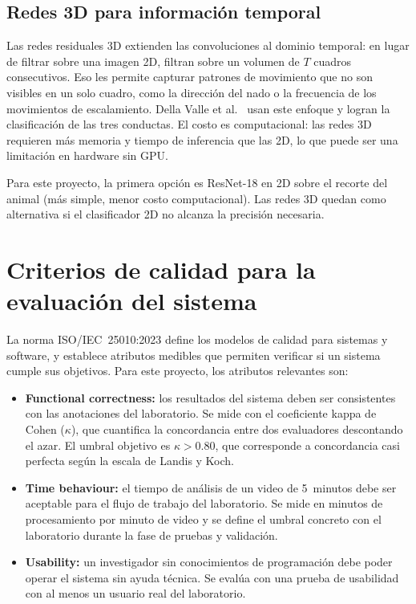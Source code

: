 \subsection{Redes 3D para información temporal}

Las redes residuales 3D extienden las convoluciones al dominio temporal: en lugar de
filtrar sobre una imagen 2D, filtran sobre un volumen de $T$ cuadros consecutivos.
Eso les permite capturar patrones de movimiento que no son visibles en un solo cuadro,
como la dirección del nado o la frecuencia de los movimientos de escalamiento. Della
Valle et al.\ \cite{della_valle2025} usan este enfoque y logran la clasificación de las
tres conductas. El costo es computacional: las redes 3D requieren más memoria y tiempo
de inferencia que las 2D, lo que puede ser una limitación en hardware sin GPU.

Para este proyecto, la primera opción es ResNet-18 en 2D sobre el recorte del animal
(más simple, menor costo computacional). Las redes 3D quedan como alternativa si el
clasificador 2D no alcanza la precisión necesaria.

\section{Criterios de calidad para la evaluación del sistema}

La norma ISO/IEC~25010:2023 \cite{iso25010} define los modelos de calidad para sistemas
y software, y establece atributos medibles que permiten verificar si un sistema cumple
sus objetivos. Para este proyecto, los atributos relevantes son:

\begin{itemize}
  \item \textbf{Functional correctness:} los resultados del sistema deben ser
        consistentes con las anotaciones del laboratorio. Se mide con el coeficiente
        kappa de Cohen ($\kappa$), que cuantifica la concordancia entre dos evaluadores
        descontando el azar. El umbral objetivo es $\kappa > 0.80$, que corresponde a
        concordancia casi perfecta según la escala de Landis y Koch.
  \item \textbf{Time behaviour:} el tiempo de análisis de un video de 5~minutos debe
        ser aceptable para el flujo de trabajo del laboratorio. Se mide en minutos de
        procesamiento por minuto de video y se define el umbral concreto con el
        laboratorio durante la fase de pruebas y validación.
  \item \textbf{Usability:} un investigador sin conocimientos de programación debe
        poder operar el sistema sin ayuda técnica. Se evalúa con una prueba de
        usabilidad con al menos un usuario real del laboratorio.
\end{itemize}

